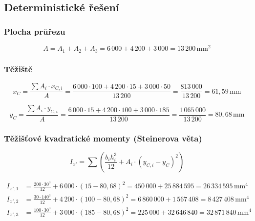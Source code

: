 \documentclass[a4paper,11pt]{article}
\newcommand{\unit}[1]{\,\mathrm{#1}}
\begin{document}
\subsection{Deterministické řešení}

\subsubsection{Plocha průřezu}

\begin{equation}
    A = A_1 + A_2 + A_3 = 6\,000 + 4\,200 + 3\,000 = \boxed{13\,200\unit{mm^2}}
\end{equation}

\subsubsection{Těžiště}

\begin{equation}
    x_C = \frac{\sum A_i \cdot x_{C,i}}{A} = \frac{6\,000 \cdot 100 + 4\,200 \cdot 15 + 3\,000 \cdot 50}{13\,200} = \frac{813\,000}{13\,200} = \boxed{61{,}59\unit{mm}}
\end{equation}

\begin{equation}
    y_C = \frac{\sum A_i \cdot y_{C,i}}{A} = \frac{6\,000 \cdot 15 + 4\,200 \cdot 100 + 3\,000 \cdot 185}{13\,200} = \frac{1\,065\,000}{13\,200} = \boxed{80{,}68\unit{mm}}
\end{equation}

\subsubsection{Těžišťové kvadratické momenty (Steinerova věta)}

\begin{equation}
    I_{x'} = \sum \left( \frac{b_i h_i^3}{12} + A_i \cdot (y_{C,i} - y_C)^2 \right)
\end{equation}

\begin{align}
    I_{x',1} &= \tfrac{200 \cdot 30^3}{12} + 6\,000 \cdot (15 - 80{,}68)^2 = 450\,000 + 25\,884\,595 = 26\,334\,595\unit{mm^4} \\
    I_{x',2} &= \tfrac{30 \cdot 140^3}{12} + 4\,200 \cdot (100 - 80{,}68)^2 = 6\,860\,000 + 1\,567\,408 = 8\,427\,408\unit{mm^4} \\
    I_{x',3} &= \tfrac{100 \cdot 30^3}{12} + 3\,000 \cdot (185 - 80{,}68)^2 = 225\,000 + 32\,646\,840 = 32\,871\,840\unit{mm^4}
\end{align}
\end{document}
